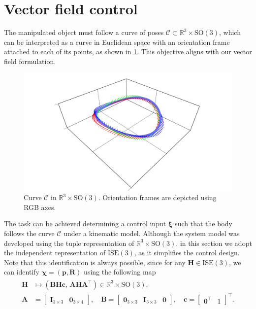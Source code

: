 \section{Vector field control}\label{sec:collaborative-path-planning}
The manipulated object must follow a curve of poses $\mathcal{C}\subset \mathbb{R}^3\times\text{SO}(3)$, which can be interpreted as a curve in Euclidean space with an orientation frame attached to each of its points, as shown in \cref{fig:curvewithframes}. This objective aligns with our vector field formulation.
\begin{figure}[ht]
    \centering
    \includegraphics[width=.8\linewidth]{figures/curve_with_frames.pdf}
    \caption{Curve $\mathcal{C}$ in $\mathbb{R}^3\times\text{SO}(3)$. Orientation frames are depicted using RGB axes.}
    \label{fig:curvewithframes}
\end{figure}

The task can be achieved determining a control input $\boldsymbol{\xi}$ such that the body follows the curve $\mathcal{C}$ under a kinematic model. Although the system model was developed using the tuple representation of $\mathbb{R}^3\times\text{SO}(3)$, in this section we adopt the independent representation of $\text{ISE}(3)$, as it simplifies the control design. Note that this identification is always possible, since for any $\mathbf{H}\in\text{ISE}(3)$, we can identify $\boldsymbol{\chi}=(\mathbf{p}, \mathbf{R})$ using the following map
\begin{align}
    \begin{split}
        \mathbf{H} &\mapsto (\mathbf{B}\mathbf{H}\mathbf{c},\, \mathbf{A}\mathbf{H}\mathbf{A}^\top) \in \mathbb{R}^3\times\text{SO}(3),\\
        \mathbf{A} &= \begin{bmatrix}
            \mathbf{I}_{3\times 3} & \mathbf{0}_{3\times 4}
        \end{bmatrix}, \quad
        \mathbf{B} = \begin{bmatrix}
            \mathbf{0}_{3\times 3} & \mathbf{I}_{3\times 3} & \mathbf{0}
        \end{bmatrix}, \quad
        \mathbf{c} = \begin{bmatrix}
            \mathbf{0}^\top & 1
        \end{bmatrix}^\top.
    \end{split}
\end{align}

